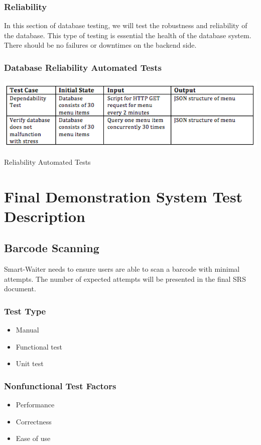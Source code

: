 \documentclass[12pt]{article}
\begin{document}
\subsubsection{Reliability}
In this section of database testing, we will test the robustness and reliability of the database.  This type of testing is essential the health of the database system. There should be no failures or downtimes on the backend side. 
\subsubsection{Database Reliability Automated Tests }
\pagebreak
\begin{table}[h]
\includegraphics[width=\textwidth,height=\textheight,keepaspectratio]{reliability_tests.png}
  \caption{Reliability Automated Tests}
\end{table}

\section{Final Demonstration System Test Description}

\subsection{Barcode Scanning}
Smart-Waiter needs to ensure users are able to scan a barcode with minimal attempts. The number of expected attempts will be presented in the final SRS document.

\subsubsection{Test Type}
\begin{itemize}
  \item Manual
  \item Functional test
  \item Unit test
\end{itemize}

\subsubsection{Nonfunctional Test Factors}
\begin{itemize}
  \item Performance
  \item 	Correctness
  \item 	Ease of use
\end{itemize}
\end{document}
